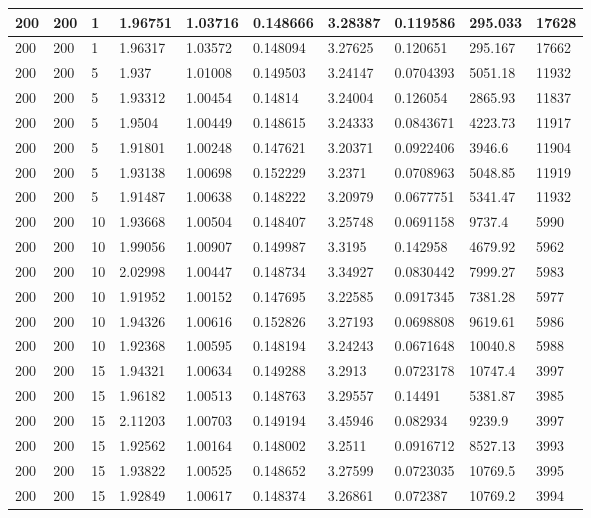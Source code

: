 \begin{landscape}
\begin{longtable}{ | l | l | l | l | l | l | l | l | l | l | }
200 & 200 & 1 & 1.96751 & 1.03716 & 0.148666 & 3.28387 & 0.119586 & 295.033 & 17628\\ \hline
200 & 200 & 1 & 1.96317 & 1.03572 & 0.148094 & 3.27625 & 0.120651 & 295.167 & 17662\\ \hline
200 & 200 & 5 & 1.937 & 1.01008 & 0.149503 & 3.24147 & 0.0704393 & 5051.18 & 11932\\ \hline
200 & 200 & 5 & 1.93312 & 1.00454 & 0.14814 & 3.24004 & 0.126054 & 2865.93 & 11837\\ \hline
200 & 200 & 5 & 1.9504 & 1.00449 & 0.148615 & 3.24333 & 0.0843671 & 4223.73 & 11917\\ \hline
200 & 200 & 5 & 1.91801 & 1.00248 & 0.147621 & 3.20371 & 0.0922406 & 3946.6 & 11904\\ \hline
200 & 200 & 5 & 1.93138 & 1.00698 & 0.152229 & 3.2371 & 0.0708963 & 5048.85 & 11919\\ \hline
200 & 200 & 5 & 1.91487 & 1.00638 & 0.148222 & 3.20979 & 0.0677751 & 5341.47 & 11932\\ \hline
200 & 200 & 10 & 1.93668 & 1.00504 & 0.148407 & 3.25748 & 0.0691158 & 9737.4 & 5990\\ \hline
200 & 200 & 10 & 1.99056 & 1.00907 & 0.149987 & 3.3195 & 0.142958 & 4679.92 & 5962\\ \hline
200 & 200 & 10 & 2.02998 & 1.00447 & 0.148734 & 3.34927 & 0.0830442 & 7999.27 & 5983\\ \hline
200 & 200 & 10 & 1.91952 & 1.00152 & 0.147695 & 3.22585 & 0.0917345 & 7381.28 & 5977\\ \hline
200 & 200 & 10 & 1.94326 & 1.00616 & 0.152826 & 3.27193 & 0.0698808 & 9619.61 & 5986\\ \hline
200 & 200 & 10 & 1.92368 & 1.00595 & 0.148194 & 3.24243 & 0.0671648 & 10040.8 & 5988\\ \hline
200 & 200 & 15 & 1.94321 & 1.00634 & 0.149288 & 3.2913 & 0.0723178 & 10747.4 & 3997\\ \hline
200 & 200 & 15 & 1.96182 & 1.00513 & 0.148763 & 3.29557 & 0.14491 & 5381.87 & 3985\\ \hline
200 & 200 & 15 & 2.11203 & 1.00703 & 0.149194 & 3.45946 & 0.082934 & 9239.9 & 3997\\ \hline
200 & 200 & 15 & 1.92562 & 1.00164 & 0.148002 & 3.2511 & 0.0916712 & 8527.13 & 3993\\ \hline
200 & 200 & 15 & 1.93822 & 1.00525 & 0.148652 & 3.27599 & 0.0723035 & 10769.5 & 3995\\ \hline
200 & 200 & 15 & 1.92849 & 1.00617 & 0.148374 & 3.26861 & 0.072387 & 10769.2 & 3994\\ \hline

\end{longtable}
\end{landscape}
